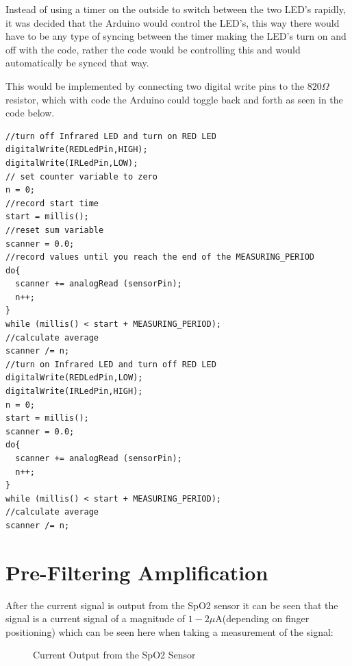 \documentclass{article}
\begin{document}
Instead of using a timer on the outside to switch between the two LED's rapidly, it was decided that the Arduino would control the LED's, this way there would have to be any type of syncing between the timer making the LED's turn on and off with the code, rather the code would be controlling this and would automatically be synced that way.

This would be implemented by connecting two digital write pins to the $820\Omega$ resistor, which with code the Arduino could toggle back and forth as seen in the code below.
\begin{lstlisting}[language=Arduino, caption= Flashing Code]
//turn off Infrared LED and turn on RED LED
digitalWrite(REDLedPin,HIGH);
digitalWrite(IRLedPin,LOW);
// set counter variable to zero
n = 0;
//record start time
start = millis();
//reset sum variable
scanner = 0.0;
//record values until you reach the end of the MEASURING_PERIOD
do{
  scanner += analogRead (sensorPin);
  n++;
}
while (millis() < start + MEASURING_PERIOD);  
//calculate average
scanner /= n; 
//turn on Infrared LED and turn off RED LED
digitalWrite(REDLedPin,LOW);
digitalWrite(IRLedPin,HIGH);
n = 0;
start = millis();
scanner = 0.0;
do{
  scanner += analogRead (sensorPin);
  n++;
}
while (millis() < start + MEASURING_PERIOD);  
//calculate average
scanner /= n; 
\end{lstlisting}
\newpage


\section{Pre-Filtering Amplification}
After the current signal is output from the SpO2 sensor it can be seen that the signal is a current signal of a magnitude of $1-2\mu$A(depending on finger positioning) which can be seen here when taking a measurement of the signal:
\begin{figure}[h]
    \centering
    \caption{Current Output from the SpO2 Sensor}
    \label{figure:SpO2CurrentOut}
\end{figure}
\end{document}
